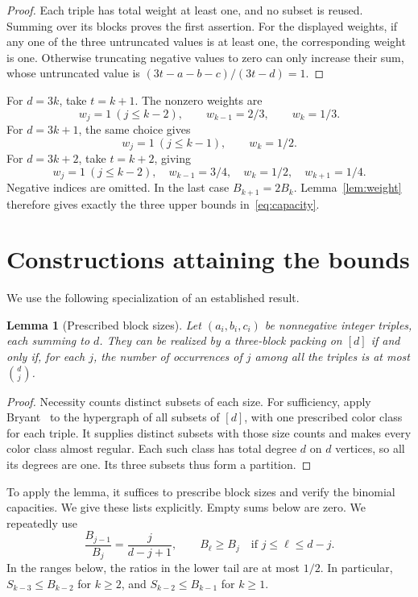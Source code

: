 \documentclass[11pt]{article}
\newtheorem{lemma}[theorem]{Lemma}
\theoremstyle{definition}
\numberwithin{equation}{section}
\begin{document}
\begin{proof}
Each triple has total weight at least one, and no subset is reused.
Summing over its blocks proves the first assertion. For the displayed
weights, if any one of the three untruncated values is at least one,
the corresponding weight is one. Otherwise truncating negative values
to zero can only increase their sum, whose untruncated value is
$(3t-a-b-c)/(3t-d)=1$.
\end{proof}

For $d=3k$, take $t=k+1$. The nonzero weights are
\[
 w_j=1\ (j\leq k-2),\qquad w_{k-1}=2/3,\qquad w_k=1/3.
\]
For $d=3k+1$, the same choice gives
\[
 w_j=1\ (j\leq k-1),\qquad w_k=1/2.
\]
For $d=3k+2$, take $t=k+2$, giving
\[
 w_j=1\ (j\leq k-2),\quad
 w_{k-1}=3/4,\quad w_k=1/2,\quad w_{k+1}=1/4.
\]
Negative indices are omitted. In the last case $B_{k+1}=2B_k$.
Lemma~\ref{lem:weight} therefore gives exactly the three upper bounds
in~\eqref{eq:capacity}.

\section{Constructions attaining the bounds}

We use the following specialization of an established result.

\begin{lemma}[Prescribed block sizes]\label{lem:realization}
Let $(a_i,b_i,c_i)$ be nonnegative integer triples, each summing to $d$.
They can be realized by a three-block packing on $[d]$ if and only if,
for each $j$, the number of occurrences of $j$ among all the triples is
at most $\binom dj$.
\end{lemma}

\begin{proof}
Necessity counts distinct subsets of each size. For sufficiency, apply
Bryant~\cite[Corollary 3]{Bryant} to the hypergraph of all subsets of
$[d]$, with one prescribed color class for each triple. It supplies
distinct subsets with those size counts and makes every color class
almost regular. Each such class has total degree $d$ on $d$ vertices,
so all its degrees are one. Its three subsets thus form a partition.
\end{proof}

To apply the lemma, it suffices to prescribe block sizes and verify the
binomial capacities. We give these lists explicitly. Empty sums below
are zero. We repeatedly use
\begin{equation}\label{eq:binomial}
 \frac{B_{j-1}}{B_j}=\frac{j}{d-j+1},
 \qquad
 B_\ell\geq B_j\quad\text{if }j\leq\ell\leq d-j.
\end{equation}
In the ranges below, the ratios in the lower tail are at most $1/2$.
In particular, $S_{k-3}\leq B_{k-2}$ for $k\geq2$, and
$S_{k-2}\leq B_{k-1}$ for $k\geq1$.
\end{document}
